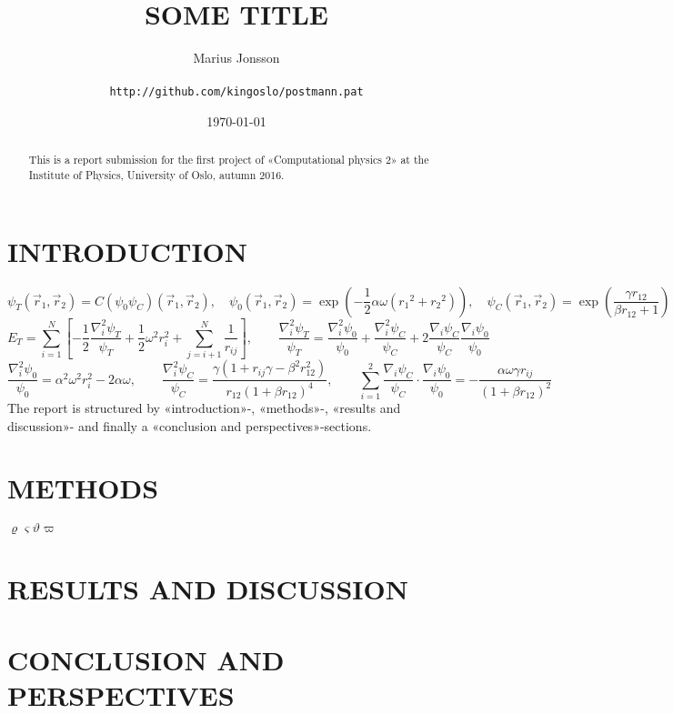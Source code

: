 \documentclass[11pt,english,a4paper]{article}
\author{\normalsize Marius Jonsson \\\\
\vspace{5px}
\normalsize \texttt{http://github.com/kingoslo/postmann.pat}}
\title{\bf \uppercase{Some title}}
\date{\normalsize \today}
\begin{document}
\maketitle
\begin{abstract} \normalsize This is a report submission for the first project of «Computational physics 2» at the Institute of Physics, University of Oslo, autumn 2016.
\end{abstract}
\lstset{
  xleftmargin=.2\textwidth, xrightmargin=.2\textwidth
}

\section*{\uppercase{Introduction}}
\[
\psi_T(\vec{r}_1, \vec{r}_2) = C(\psi_0 \psi_C)(\vec{r}_1, \vec{r}_2), \quad  \psi_0(\vec{r}_1, \vec{r}_2) = \exp \left(-\frac{1}{2} \alpha  \omega  \left( {{r}_1}^2+  {{r}_2}^2\right)\right),  \quad  \psi_C(\vec{r}_1, \vec{r}_2) =  \exp \left( \frac{\gamma r_{  12}}{\beta  r_{  12}+1} \right)
\]
\[
E_T = \sum_{i=1}^N \left[ -\frac{1}{2} \frac{\nabla^2_i \psi_T}{\psi_T} + \frac{1}{2} \omega^2 r_i^2 + \sum_{j=i+1}^N \frac{1}{r_{ij}} \right], \qquad \frac{\nabla_i^2 \psi_T}{\psi_T} = \frac{\nabla_i^2 \psi_0}{\psi_0} + \frac{\nabla_i^2 \psi_C}{\psi_C} + 2\frac{\nabla_i \psi_C}{\psi_C}\frac{\nabla_i \psi_0}{\psi_0}
\]
\[
\frac{\nabla_i^2 \psi_0}{\psi_0} = \alpha^2 \omega^2 r_i^2 - 2 \alpha \omega, \qquad
\frac{\nabla_i^2 \psi_C}{\psi_C} = \frac{\gamma (1 + r_{ij} \gamma - \beta^2 r_{  12}^2)}{r_{  12}(1 + \beta r_{  12})^4}, \qquad \sum_{i=1}^2 \frac{\nabla_i \psi_C}{\psi_C}\cdot \frac{\nabla_i \psi_0}{\psi_0} = - \frac{\alpha \omega \gamma r_{ij}}{(1 + \beta r_{12})^2}
\]
The report is structured by «introduction»-, «methods»-, «results and discussion»- and finally a «conclusion and perspectives»-sections.
\section*{\uppercase{Methods}}
$\varrho \varsigma \vartheta \varpi$
\section*{\uppercase{Results and discussion}}
\section*{\uppercase{Conclusion and perspectives}}
\end{document}
